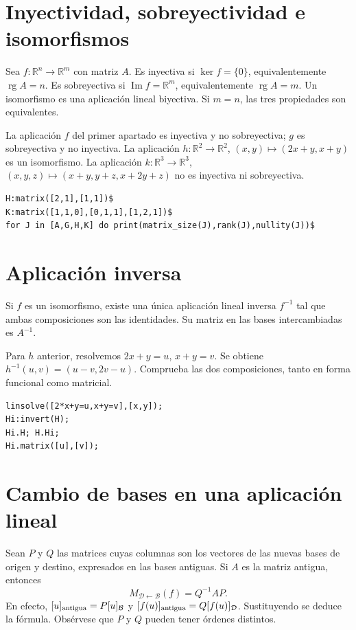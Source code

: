\documentclass[12pt,a4paper]{article}
\begin{document}
\section{Inyectividad, sobreyectividad e isomorfismos}
Sea $f:\mathbb R^n\to\mathbb R^m$ con matriz $A$. Es inyectiva si $\ker f=\{0\}$, equivalentemente $\operatorname{rg}A=n$. Es sobreyectiva si $\operatorname{Im}f=\mathbb R^m$, equivalentemente $\operatorname{rg}A=m$. Un isomorfismo es una aplicación lineal biyectiva. Si $m=n$, las tres propiedades son equivalentes.

La aplicación $f$ del primer apartado es inyectiva y no sobreyectiva; $g$ es sobreyectiva y no inyectiva. La aplicación $h:\mathbb R^2\to\mathbb R^2$, $(x,y)\mapsto(2x+y,x+y)$ es un isomorfismo. La aplicación $k:\mathbb R^3\to\mathbb R^3$, $(x,y,z)\mapsto(x+y,y+z,x+2y+z)$ no es inyectiva ni sobreyectiva.
\begin{lstlisting}
H:matrix([2,1],[1,1])$
K:matrix([1,1,0],[0,1,1],[1,2,1])$
for J in [A,G,H,K] do print(matrix_size(J),rank(J),nullity(J))$
\end{lstlisting}
\section{Aplicación inversa}
Si $f$ es un isomorfismo, existe una única aplicación lineal inversa $f^{-1}$ tal que ambas composiciones son las identidades. Su matriz en las bases intercambiadas es $A^{-1}$.

Para $h$ anterior, resolvemos $2x+y=u$, $x+y=v$. Se obtiene $h^{-1}(u,v)=(u-v,2v-u)$. Comprueba las dos composiciones, tanto en forma funcional como matricial.
\begin{lstlisting}
linsolve([2*x+y=u,x+y=v],[x,y]);
Hi:invert(H);
Hi.H; H.Hi;
Hi.matrix([u],[v]);
\end{lstlisting}
\section{Cambio de bases en una aplicación lineal}
Sean $P$ y $Q$ las matrices cuyas columnas son los vectores de las nuevas bases de origen y destino, expresados en las bases antiguas. Si $A$ es la matriz antigua, entonces
\[\boxed{M_{\mathcal D\leftarrow\mathcal B}(f)=Q^{-1}AP.}\]
En efecto, $[u]_{\rm antigua}=P[u]_{\mathcal B}$ y $[f(u)]_{\rm antigua}=Q[f(u)]_{\mathcal D}$. Sustituyendo se deduce la fórmula. Obsérvese que $P$ y $Q$ pueden tener órdenes distintos.
\end{document}
